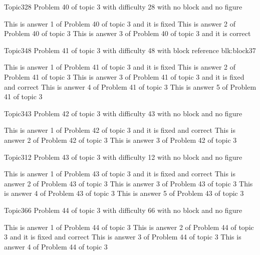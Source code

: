 \documentclass[master]{exam}
\begin{document}
\begin{problem}{Topic3}{28}
	Problem 40 of topic 3 with difficulty 28 with no block and no figure
	\begin{answers}
		\answer[fixed] This is answer 1 of Problem 40 of topic 3 and it is fixed
		\answer This is answer 2 of Problem 40 of topic 3 
		\answer[correct] This is answer 3 of Problem 40 of topic 3 and it is correct
	\end{answers}
\end{problem}

\begin{problem}[requires=blk:block37]{Topic3}{48}
	Problem 41 of topic 3 with difficulty 48 with block reference blk:block37
	\begin{answers}
		\answer[fixed] This is answer 1 of Problem 41 of topic 3 and it is fixed
		\answer This is answer 2 of Problem 41 of topic 3 
		 This is answer 3 of Problem 41 of topic 3 and it is fixed and correct
		\answer This is answer 4 of Problem 41 of topic 3 
		\answer This is answer 5 of Problem 41 of topic 3 
	\end{answers}
\end{problem}

\begin{problem}{Topic3}{43}
	Problem 42 of topic 3 with difficulty 43 with no block and no figure
	\begin{answers}
		 This is answer 1 of Problem 42 of topic 3 and it is fixed and correct
		\answer This is answer 2 of Problem 42 of topic 3 
		\answer This is answer 3 of Problem 42 of topic 3 
	\end{answers}
\end{problem}

\begin{problem}{Topic3}{12}
	Problem 43 of topic 3 with difficulty 12 with no block and no figure
	\begin{answers}
		 This is answer 1 of Problem 43 of topic 3 and it is fixed and correct
		\answer This is answer 2 of Problem 43 of topic 3 
		\answer This is answer 3 of Problem 43 of topic 3 
		\answer This is answer 4 of Problem 43 of topic 3 
		\answer This is answer 5 of Problem 43 of topic 3 
	\end{answers}
\end{problem}

\begin{problem}{Topic3}{66}
	Problem 44 of topic 3 with difficulty 66 with no block and no figure
	\begin{answers}
		\answer This is answer 1 of Problem 44 of topic 3 
		 This is answer 2 of Problem 44 of topic 3 and it is fixed and correct
		\answer This is answer 3 of Problem 44 of topic 3 
		\answer This is answer 4 of Problem 44 of topic 3 
	\end{answers}
\end{problem}
\end{document}
